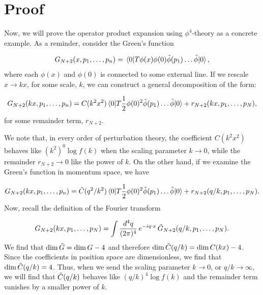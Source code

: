 \documentclass{article}
\begin{document}
\section{Proof}

Now, we will prove the operator product expansion using $\phi^4$-theory as a concrete example. As a reminder, consider the Green's function

\begin{equation}
    G_{N+2}(x, p_1,\dots, p_n) = \mel{0}{T\phi(x)\phi(0)\Tilde{\phi}(p_1)\dots\Tilde{\phi}}{0},
\end{equation}
where each $\phi(x)$ and $\phi(0)$ is connected to some external line. If we rescale $x \rightarrow kx$, for some scale, $k$, we can construct a general decomposition of the form:

\begin{equation}
    G_{N+2}(kx, p_1,\dots, p_n) = C(k^2x^2)\mel{0}{T\frac{1}{2}\phi(0)^2\Tilde{\phi}(p_1)\dots\Tilde{\phi}}{0} + r_{N+2}(kx,p_1,\dots,p_N),
    \label{green's decomposed}
\end{equation}
for some remainder term, $r_{N+2}$.     

We note that, in every order of perturbation theory, the coefficient $C(k^2x^2)$ behaves like $(k^2)^0\log f(k)$ when the scaling parameter $k\rightarrow 0$, while the remainder $r_{N+2}\rightarrow0$ like the power of $k$. On the other hand, if we examine the Green's function in momentum space, we have 

\begin{equation}
    G_{N+2}(kx, p_1,\dots, p_n) = \Tilde{C}(q^2/k^2)\mel{0}{T\frac{1}{2}\phi(0)^2\Tilde{\phi}(p_1)\dots\Tilde{\phi}}{0} + r_{N+2}(q/k,p_1,\dots,p_N).
    \label{green with remainder}
\end{equation}
Now, recall the definition of the Fourier transform

\begin{equation}
    G_{N+2}(kx,p_1,\dots,p_N) = \int \frac{d^4q}{(2\pi)^4} \, e^{-iq\cdot x} \, \Tilde{G}_{N+2}(q/k,p_1,\dots,p_N).
    \label{green with remainder in momentum}
\end{equation}
We find that $\mathrm{dim}\,\Tilde{G} = \mathrm{dim}\,G-4$ and therefore $\mathrm{dim}\,\Tilde{C}(q/k) = \mathrm{dim}\,C(kx)-4$. Since the coefficients in position space are dimensionless, we find that $\mathrm{dim}\,\Tilde{C}(q/k)=4$. Thus, when we send the scaling parameter $k\rightarrow 0$, or $q/k \rightarrow \infty$, we will find that $\Tilde{C}(q/k)$ behaves like $(q/k)^4 \log f(k) $ and the remainder term vanishes by a smaller power of $k$. 
\end{document}
